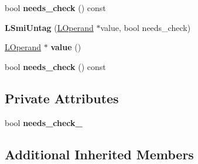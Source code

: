 \begin{DoxyCompactItemize}
\item 
bool {\bfseries needs\+\_\+check} () const \hypertarget{classv8_1_1internal_1_1_l_smi_untag_a018002e5d63a6636917daf709371ecea}{}\label{classv8_1_1internal_1_1_l_smi_untag_a018002e5d63a6636917daf709371ecea}

\item 
{\bfseries L\+Smi\+Untag} (\hyperlink{classv8_1_1internal_1_1_l_operand}{L\+Operand} $\ast$value, bool needs\+\_\+check)\hypertarget{classv8_1_1internal_1_1_l_smi_untag_a99550a964b25423e9a97f87404e62eb7}{}\label{classv8_1_1internal_1_1_l_smi_untag_a99550a964b25423e9a97f87404e62eb7}

\item 
\hyperlink{classv8_1_1internal_1_1_l_operand}{L\+Operand} $\ast$ {\bfseries value} ()\hypertarget{classv8_1_1internal_1_1_l_smi_untag_a50eaec50a1f507400e188bf08855dbe0}{}\label{classv8_1_1internal_1_1_l_smi_untag_a50eaec50a1f507400e188bf08855dbe0}

\item 
bool {\bfseries needs\+\_\+check} () const \hypertarget{classv8_1_1internal_1_1_l_smi_untag_a018002e5d63a6636917daf709371ecea}{}\label{classv8_1_1internal_1_1_l_smi_untag_a018002e5d63a6636917daf709371ecea}

\end{DoxyCompactItemize}
\subsection*{Private Attributes}
\begin{DoxyCompactItemize}
\item 
bool {\bfseries needs\+\_\+check\+\_\+}\hypertarget{classv8_1_1internal_1_1_l_smi_untag_a43f76e211a09eaa6d16d33a819211e45}{}\label{classv8_1_1internal_1_1_l_smi_untag_a43f76e211a09eaa6d16d33a819211e45}

\end{DoxyCompactItemize}
\subsection*{Additional Inherited Members}


